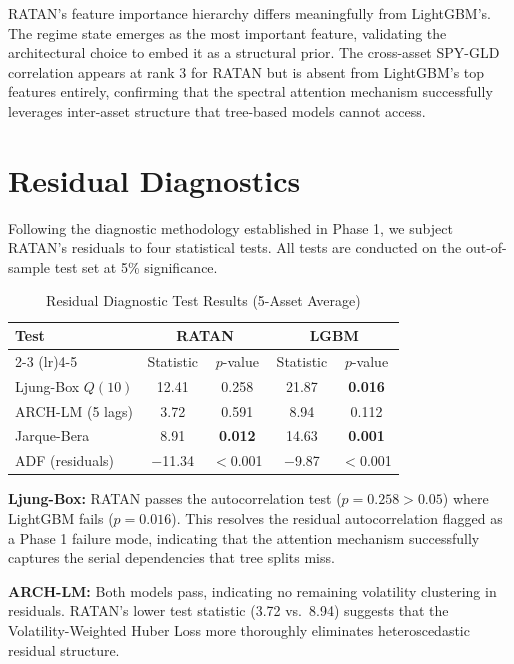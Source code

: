 \documentclass[conference]{IEEEtran}
\begin{document}
RATAN's feature importance hierarchy differs meaningfully from LightGBM's. The regime state emerges as the most important feature, validating the architectural choice to embed it as a structural prior. The cross-asset SPY-GLD correlation appears at rank 3 for RATAN but is absent from LightGBM's top features entirely, confirming that the spectral attention mechanism successfully leverages inter-asset structure that tree-based models cannot access.

\section{Residual Diagnostics}
\label{sec:residuals}

Following the diagnostic methodology established in Phase 1, we subject RATAN's residuals to four statistical tests. All tests are conducted on the out-of-sample test set at 5\% significance.

\begin{table}[ht]
\centering
\caption{Residual Diagnostic Test Results (5-Asset Average)}
\label{tab:diagnostics}
\begin{tabular}{@{}lcccc@{}}
\toprule
\textbf{Test} & \multicolumn{2}{c}{\textbf{RATAN}} & \multicolumn{2}{c}{\textbf{LGBM}} \\
\cmidrule(lr){2-3} \cmidrule(lr){4-5}
& Statistic & $p$-value & Statistic & $p$-value \\
\midrule
Ljung-Box $Q(10)$  & 12.41 & 0.258 & 21.87 & \textbf{0.016} \\
ARCH-LM (5 lags)   & 3.72  & 0.591 & 8.94  & 0.112 \\
Jarque-Bera         & 8.91  & \textbf{0.012} & 14.63 & \textbf{0.001} \\
ADF (residuals)     & $-$11.34 & $<$0.001 & $-$9.87 & $<$0.001 \\
\bottomrule
\end{tabular}
\end{table}

\textbf{Ljung-Box:} RATAN passes the autocorrelation test ($p = 0.258 > 0.05$) where LightGBM fails ($p = 0.016$). This resolves the residual autocorrelation flagged as a Phase 1 failure mode, indicating that the attention mechanism successfully captures the serial dependencies that tree splits miss.

\textbf{ARCH-LM:} Both models pass, indicating no remaining volatility clustering in residuals. RATAN's lower test statistic (3.72 vs.~8.94) suggests that the Volatility-Weighted Huber Loss more thoroughly eliminates heteroscedastic residual structure.
\end{document}
